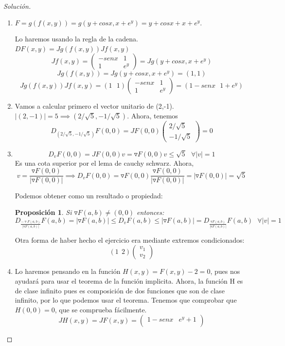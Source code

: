 \documentclass[11pt, a4paper, titlepage]{article}
\theoremstyle{exercise-style}
\newenvironment{nlist}
{\begin{enumerate}
\renewcommand\labelenumi{(\emph{\roman{enumi})}}}
{\end{enumerate}}
\theoremstyle{theorem-style}
\newtheorem*{nprop}{Proposición}
\begin{document}
\begin{proof}[Solución]
	\begin{nlist}
	\item $F=g(f(x,y)) = g(y+cosx,x+e^y) = y+cosx+x+e^y$.
	
	Lo haremos usando la regla de la cadena. $DF(x,y) = Jg(f(x,y))Jf(x,y)$
	\[
	Jf(x,y)= \begin{pmatrix}
 -senx & 1 \\
 1 & e^y 
\end{pmatrix} = Jg(y+cosx,x+e^y)
	\]
	\[
	Jg(f(x,y))=Jg(y+cosx,x+e^y) = (1,1)
	\]
	\[
	Jg(f(x,y))Jf(x,y) = (1 \ \ \ 1)\begin{pmatrix}
 -senx & 1 \\
 1 & e^y 
\end{pmatrix} = (1- senx \ \ \ 1+e^y)
	\]
	
	\item Vamos a calcular primero el vector unitario de (2,-1). $|(2,-1)| = 5 \implies (2/\sqrt5, -1/ \sqrt5)$. Ahora, tenemos
	\[
	D_{ (2/\sqrt5, -1/ \sqrt5)}F(0,0) = JF(0,0) \begin{pmatrix}
 2/\sqrt 5  \\
 -1/\sqrt5
\end{pmatrix} = 0 
	\]
	
	\item \[
	D_vF(0,0) = JF(0,0) v =  \triangledown F(0,0) v \leq \sqrt 5 \ \ \ \forall |v| = 1	\]
	Es una cota superior por el lema de cauchy schwarz.
	Ahora, \[
	v = \frac{\triangledown F(0,0)}{|\triangledown F(0,0)|} \implies D_v F(0,0) = \triangledown F(0,0)  \frac{\triangledown F(0,0)}{|\triangledown F(0,0)|} = |\triangledown F(0,0)| = \sqrt 5
	\]
	
	Podemos obtener como un resultado o propiedad:
	
	\begin{nprop}
	Si $\triangledown F(a,b) \ne (0,0)$ entonces:
	\[
	D_{ \frac{-\triangledown F(a,b)}{|\triangledown F(a,b)|}}F(a,b) =  |\triangledown F(a,b)| \leq D_v F(a,b) \leq |\triangledown F(a,b)| = D_{ \frac{\triangledown F(a,b)}{|\triangledown F(a,b)|}}F(a,b) \ \ \ \forall |v| = 1
	\]
\end{nprop}

Otra forma de haber hecho el ejercicio era mediante extremos condicionados:
\[
(1 \ \ 2) \begin{pmatrix}
 v_1 \\
 v_2 
\end{pmatrix} 
\]

\item Lo haremos pensando en la función $H(x,y) =F(x,y)-2 = 0$, pues nos ayudará para usar el teorema de la función implicita. Ahora, la función H es de clase infinito pues es composición de dos funciones que son de clase infinito, por lo que podemos usar el teorema. Tenemos que comprobar que $H(0,0) = 0$, que se comprueba fácilmente.
\[
JH(x,y) = JF(x,y) = \begin{pmatrix}
 1-senx & e^y+1 \\
 

\end{pmatrix}\]
\end{nlist}
\end{proof}
\end{document}
